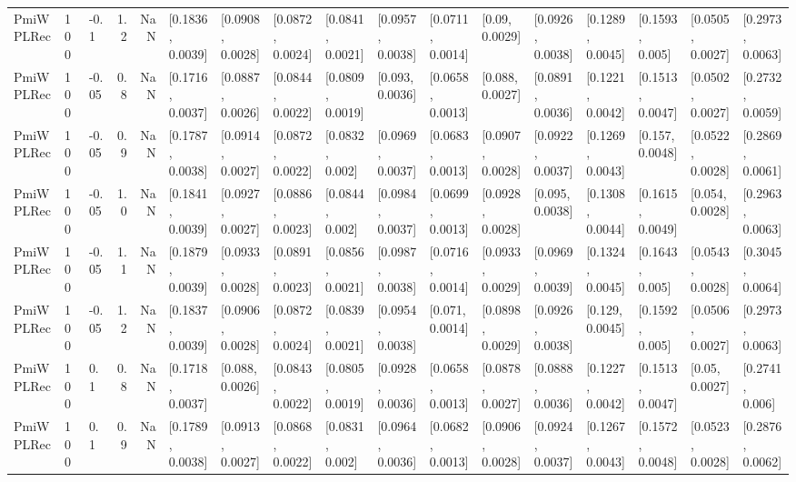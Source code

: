 \begin{tabular}{lllrrllllllllllll}
 PmiWPLRec &  100 &  -0.1 &   1.2 &   NaN &  [0.1836, 0.0039] &  [0.0908, 0.0028] &  [0.0872, 0.0024] &  [0.0841, 0.0021] &  [0.0957, 0.0038] &  [0.0711, 0.0014] &    [0.09, 0.0029] &  [0.0926, 0.0038] &  [0.1289, 0.0045] &   [0.1593, 0.005] &  [0.0505, 0.0027] &  [0.2973, 0.0063] \\
 PmiWPLRec &  100 & -0.05 &   0.8 &   NaN &  [0.1716, 0.0037] &  [0.0887, 0.0026] &  [0.0844, 0.0022] &  [0.0809, 0.0019] &   [0.093, 0.0036] &  [0.0658, 0.0013] &   [0.088, 0.0027] &  [0.0891, 0.0036] &  [0.1221, 0.0042] &  [0.1513, 0.0047] &  [0.0502, 0.0027] &  [0.2732, 0.0059] \\
 PmiWPLRec &  100 & -0.05 &   0.9 &   NaN &  [0.1787, 0.0038] &  [0.0914, 0.0027] &  [0.0872, 0.0022] &   [0.0832, 0.002] &  [0.0969, 0.0037] &  [0.0683, 0.0013] &  [0.0907, 0.0028] &  [0.0922, 0.0037] &  [0.1269, 0.0043] &   [0.157, 0.0048] &  [0.0522, 0.0028] &  [0.2869, 0.0061] \\
 PmiWPLRec &  100 & -0.05 &   1.0 &   NaN &  [0.1841, 0.0039] &  [0.0927, 0.0027] &  [0.0886, 0.0023] &   [0.0844, 0.002] &  [0.0984, 0.0037] &  [0.0699, 0.0013] &  [0.0928, 0.0028] &   [0.095, 0.0038] &  [0.1308, 0.0044] &  [0.1615, 0.0049] &   [0.054, 0.0028] &  [0.2963, 0.0063] \\
 PmiWPLRec &  100 & -0.05 &   1.1 &   NaN &  [0.1879, 0.0039] &  [0.0933, 0.0028] &  [0.0891, 0.0023] &  [0.0856, 0.0021] &  [0.0987, 0.0038] &  [0.0716, 0.0014] &  [0.0933, 0.0029] &  [0.0969, 0.0039] &  [0.1324, 0.0045] &   [0.1643, 0.005] &  [0.0543, 0.0028] &  [0.3045, 0.0064] \\
 PmiWPLRec &  100 & -0.05 &   1.2 &   NaN &  [0.1837, 0.0039] &  [0.0906, 0.0028] &  [0.0872, 0.0024] &  [0.0839, 0.0021] &  [0.0954, 0.0038] &   [0.071, 0.0014] &  [0.0898, 0.0029] &  [0.0926, 0.0038] &   [0.129, 0.0045] &   [0.1592, 0.005] &  [0.0506, 0.0027] &  [0.2973, 0.0063] \\
 PmiWPLRec &  100 &   0.1 &   0.8 &   NaN &  [0.1718, 0.0037] &   [0.088, 0.0026] &  [0.0843, 0.0022] &  [0.0805, 0.0019] &  [0.0928, 0.0036] &  [0.0658, 0.0013] &  [0.0878, 0.0027] &  [0.0888, 0.0036] &  [0.1227, 0.0042] &  [0.1513, 0.0047] &    [0.05, 0.0027] &   [0.2741, 0.006] \\
 PmiWPLRec &  100 &   0.1 &   0.9 &   NaN &  [0.1789, 0.0038] &  [0.0913, 0.0027] &  [0.0868, 0.0022] &   [0.0831, 0.002] &  [0.0964, 0.0036] &  [0.0682, 0.0013] &  [0.0906, 0.0028] &  [0.0924, 0.0037] &  [0.1267, 0.0043] &  [0.1572, 0.0048] &  [0.0523, 0.0028] &  [0.2876, 0.0062] \\

\end{tabular}
